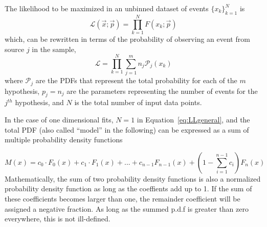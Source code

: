 The likelihood to be maximized in an unbinned dataset of events $\{x_k\}^N_{k=1}$ is
%
\begin{equation}
\mathcal{L}(\vec{x};\vec{p}) =\prod^N_{k=1} F(x_k;\vec{p})
\end{equation}
%
which, can be rewritten in terms of the probability of observing an event from source $j$ in the sample,
%
\begin{equation}
\mathcal{L} =  \prod^N_{k=1} \sum^m_{j=1} n_j  \mathcal{P}_j(x_k)
 \label{eq:LLgeneral}
\end{equation}
%
where $\mathcal{P}_j$ are the PDFs that represent the total probability for each of the $m$ hypothesis, $p_j=n_j$ are the parameters representing the number of events for the $j^{th}$ hypothesis, and $N$ is the total number of input data points.



In the case of one dimensional fits, $N=1$ in Equation~\ref{eq:LLgeneral}, and the total PDF (also called ``model'' in the following) can be expressed as a sum of multiple probability density functions
 
\begin{equation}
M(x) = c_0 \cdot F_0(x) + c_1 \cdot F_1(x)+...+c_{n-1}F_{n-1}(x)+ (1-\sum^{n-1}_{i=1}c_i) F_n(x)
\end{equation}
%
Mathematically, the sum of two probability density functions is also a normalized probability density function as long as the coeffients add up to 1. 
If the sum of these coefficients becomes larger than one, the remainder coefficient will be assigned a negative fraction. As long as the summed p.d.f is greater than zero everywhere, this is not ill-defined. %


